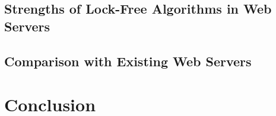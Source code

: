 \documentclass[twoside]{article}
\begin{document}
\begin{multicols}{2}
\subsection{Strengths of Lock-Free Algorithms in Web Servers}
\subsection{Comparison with Existing Web Servers}
\section{Conclusion}

\end{multicols}
\end{document}

